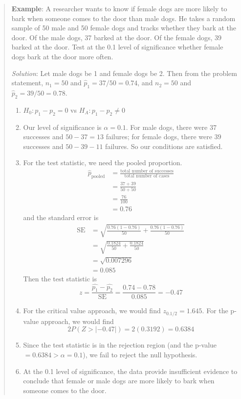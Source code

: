 \documentclass[
]{book}
\providecommand{\tightlist}{%
  \setlength{\itemsep}{0pt}\setlength{\parskip}{0pt}}
\begin{document}
\begin{quote}
\textbf{Example}: A researcher wants to know if female dogs are more likely to bark when someone comes to the door than male dogs. He takes a random sample of 50 male and 50 female dogs and tracks whether they bark at the door. Of the male dogs, 37 barked at the door. Of the female dogs, 39 barked at the door. Test at the 0.1 level of significance whether female dogs bark at the door more often.

\emph{Solution}: Let male dogs be 1 and female dogs be 2. Then from the problem statement, \(n_1=50\) and \(\hat{p}_1=37/50=0.74\), and \(n_2=50\) and \(\hat{p}_2=39/50=0.78\).

\begin{enumerate}
\def\labelenumi{\arabic{enumi}.}
\tightlist
\item
  \(H_0: p_1-p_2=0\) vs \(H_A: p_1-p_2\ne0\)
\item
  Our level of significance is \(\alpha=0.1\). For male dogs, there were \(37\) successes and \(50-37=13\) failures; for female dogs, there were \(39\) successes and \(50-39-11\) failures. So our conditions are satisfied.
\item
  For the test statistic, we need the pooled proportion.
  \[\begin{aligned}
  \hat{p}_{\text{pooled}} &= \frac{\text{total number of successes}}{\text{total number of cases}} \\
  &= \frac{37+39}{50+50}\\ &= \frac{76}{100} \\ &= 0.76
  \end{aligned}\]
  and the standard error is
  \[\begin{aligned}
  \text{SE} &= \sqrt{\frac{0.76(1-0.76)}{50} + \frac{0.76(1-0.76)}{50}} \\
  &= \sqrt{\frac{0.1824}{50} + \frac{0.1824}{50}} \\
  &= \sqrt{0.007296} \\ &= 0.085
  \end{aligned}\]
  Then the test statistic is \[z = \frac{\hat{p_1}-\hat{p_2}}{\text{SE}} = \frac{0.74-0.78}{0.085} = -0.47 \]
\item
  For the critical value approach, we would find \(z_{0.1/2}=1.645\). For the p-value approach, we would find \[2P(Z > |-0.47|) = 2(0.3192) = 0.6384\]
\item
  Since the test statistic is in the rejection region (and the p-value \(=0.6384>\alpha=0.1\)), we fail to reject the null hypothesis.
\item
  At the 0.1 level of significance, the data provide insufficient evidence to conclude that female or male dogs are more likely to bark when someone comes to the door.
\end{enumerate}
\end{quote}
\end{document}
